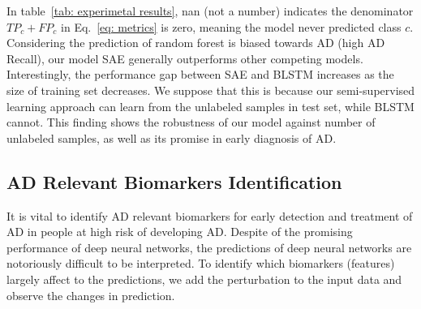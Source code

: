 \begin{table}[h]
\begin{tabular}{|c|c|c|c|c|c|}
    \cline{1-6}
    \end{tabular}
\end{table}
In table~\ref{tab: experimetal results}, nan (not a number) indicates the denominator $TP_c + FP_c$ in Eq.~\eqref{eq: metrics} is zero, meaning the model never predicted class $c$. Considering the prediction of random forest is biased towards AD (high AD Recall), our model SAE generally outperforms other competing models. Interestingly, the performance gap between SAE and BLSTM increases as the size of training set decreases. We suppose that this is because our semi-supervised learning approach can learn from the unlabeled samples in test set, while BLSTM cannot. This finding shows the robustness of our model against number of unlabeled samples, as well as its promise in early diagnosis of AD.
\subsection{AD Relevant Biomarkers Identification}
It is vital to identify AD relevant biomarkers for early detection and treatment of AD in people at high risk of developing AD. Despite of the promising performance of deep neural networks, the predictions of deep neural networks are notoriously difficult to be interpreted. To identify which biomarkers (features) largely affect to the predictions, we add the perturbation to the input data and observe the changes in prediction.

